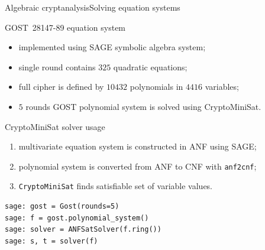 \documentclass[10pt, ucs]{beamer}
\begin{document}
\begin{frame}[fragile, shrink=2]{Algebraic cryptanalysis}{Solving equation systems}
    \begin{block}{GOST~28147-89 equation system}
        \begin{itemize}
            \item implemented using SAGE symbolic algebra system;
            \item single round contains $325$ quadratic equations;
            \item full cipher is defined by $10432$ polynomials in $4416$ variables;
            \item $5$ rounds GOST polynomial system is solved using CryptoMiniSat.
        \end{itemize}
    \end{block}

    \begin{block}{CryptoMiniSat solver usage}
    \begin{enumerate}
        \item multivariate equation system is constructed in ANF using SAGE;
        \item polynomial system is converted from ANF to CNF with \verb+anf2cnf+;
        \item \verb+CryptoMiniSat+ finds satisfiable set of variable values.
    \end{enumerate}
    \end{block}
    \begin{example}
\begin{lstlisting}
sage: gost = Gost(rounds=5)
sage: f = gost.polynomial_system()
sage: solver = ANFSatSolver(f.ring())
sage: s, t = solver(f)
\end{lstlisting}
    \end{example}
\end{frame}
\end{document}
